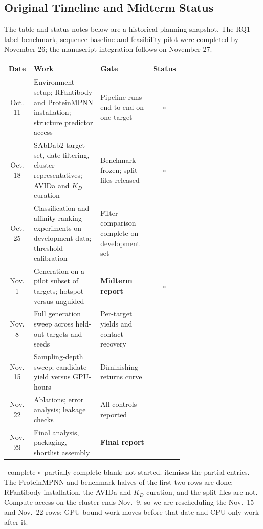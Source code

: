 \documentclass[11pt, logo, nonumbering]{preprint}
\begin{document}
\subsection{Original Timeline and Midterm Status}
The table and status notes below are a historical planning snapshot. The RQ1
label benchmark, sequence baseline and feasibility pilot were completed by
November 26; the manuscript integration follows on November 27.
\begin{center}
\small
\begin{tabular}{@{}c p{0.38\linewidth} p{0.30\linewidth} c@{}}
\toprule
\textbf{Date} & \textbf{Work} & \textbf{Gate} & \textbf{Status} \\
\midrule
Oct. 11 & Environment setup; RFantibody and ProteinMPNN installation; structure predictor access & Pipeline runs end to end on one target & $\circ$ \\
\addlinespace
Oct. 18 & SAbDab2 target set, date filtering, cluster representatives; AVIDa and $K_D$ curation & Benchmark frozen; split files released & $\circ$ \\
\addlinespace
Oct. 25 & Classification and affinity-ranking experiments on development data; threshold calibration & Filter comparison complete on development set & \\
\addlinespace
Nov. 1 & Generation on a pilot subset of targets; hotspot versus unguided & \textbf{Midterm report} & $\circ$ \\
\addlinespace
Nov. 8 & Full generation sweep across held-out targets and seeds & Per-target yields and contact recovery & \\
\addlinespace
Nov. 15 & Sampling-depth sweep; candidate yield versus GPU-hours & Diminishing-returns curve & \\
\addlinespace
Nov. 22 & Ablations; error analysis; leakage checks & All controls reported & \\
\addlinespace
Nov. 29 & Final analysis, packaging, shortlist assembly & \textbf{Final report} & \\
\bottomrule
\end{tabular}
\end{center}

\noindent\small \checkmark\ complete \quad $\circ$\ partially complete \quad blank: not started.
 itemises the partial entries. The ProteinMPNN and benchmark
halves of the first two rows are done; RFantibody installation, the AVIDa and $K_D$
curation, and the split files are not. Compute access on the cluster ends Nov.~9,
so we are rescheduling the Nov.~15 and Nov.~22 rows: GPU-bound work moves before
that date and CPU-only work after it.\normalsize
\end{document}
